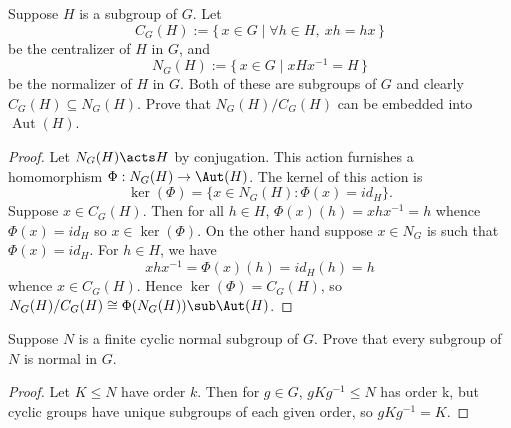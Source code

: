 \documentclass[12pt]{article}
\begin{document}
\begin{homeworkProblem}
  Suppose $H$ is a subgroup of $G$. Let
  \[
    C_G(H) := \{\, x \in G \mid \forall h \in H,\ xh = hx \,\}
  \]
  be the centralizer of $H$ in $G$, and
  \[
    N_G(H) := \{\, x \in G \mid xHx^{-1} = H \,\}
  \]
  be the normalizer of $H$ in $G$. Both of these are subgroups of $G$ and clearly $C_G(H) \subseteq N_G(H)$. Prove that $N_G(H)/C_G(H)$ can be embedded into $\operatorname{Aut}(H)$.

  \begin{proof}
    Let $ N_{G}(H)\acts H $ by conjugation. This action furnishes a homomorphism $ \Phi:N_{G}(H)\to \Aut(H) $. The kernel of this action is 
    \[
      \ker(\Phi) = \{x\in N_{G}(H): \Phi(x)= id_{H}\}.
    \]
    Suppose $ x\in C_{G}(H) $. Then for all $ h\in H $, $ \Phi(x)(h) = xhx^{-1} = h $ whence $ \Phi(x) = id_{H} $ so $ x\in \ker(\Phi)$. On the other hand suppose $ x\in N_{G} $ is such that $ \Phi(x) = id_{H} $. For $ h\in H $, we have 
    \[
      xhx^{-1} = \Phi(x)(h) = id_{H}(h) = h 
    \]
    whence $ x\in C_{G}(H) $. Hence $ \ker(\Phi) = C_{G}(H) $, so $ N_{G}(H)/C_{G}(H)\cong \Phi(N_{G}(H))\sub \Aut(H) $.
  \end{proof}

\end{homeworkProblem}

\begin{homeworkProblem}
Suppose $N$ is a finite cyclic normal subgroup of $G$. Prove that every subgroup of $N$ is normal in $G$.

\begin{proof}
  Let $ K\leq N $ have order $ k $. Then for $ g\in G $, $ gKg^{-1}\leq N $ has order k, but cyclic groups have unique subgroups of each given order, so $ gKg^{-1}=K $.
\end{proof}
\end{homeworkProblem}
\end{document}
